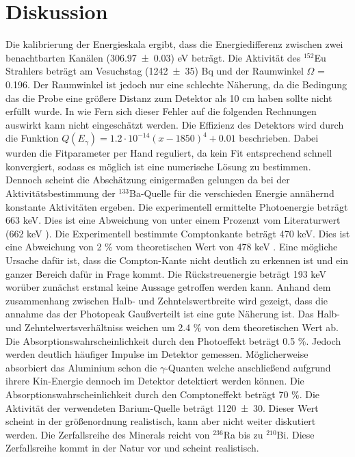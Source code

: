 \section{Diskussion}
\label{sec:Diskussion}
Die kalibrierung der Energieskala ergibt, dass die Energiedifferenz zwischen zwei benachtbarten Kanälen (\num{306.97 +- 0.03}) eV beträgt. Die Aktivität des $^{152}$Eu Strahlers beträgt am Vesuchstag (\num{1242 +- 35}) Bq und der Raumwinkel $\Omega$ = 0.196. Der Raumwinkel ist jedoch nur eine schlechte Näherung, da die Bedingung das die Probe eine größere Distanz zum Detektor als 10 cm haben sollte nicht erfüllt wurde. In wie Fern sich dieser Fehler auf die folgenden Rechnungen auswirkt kann nicht eingeschätzt werden. Die Effizienz des Detektors wird durch die Funktion $Q(E_\gamma) = 1.2 \cdot 10^{-14} (x-1850)^4 +0.01$ beschrieben. Dabei wurden die Fitparameter per Hand reguliert, da kein Fit entsprechend schnell konvergiert, sodass es möglich ist eine numerische Lösung zu bestimmen. Dennoch scheint die Abschätzung einigermaßen gelungen da bei der Aktivitätsbestimmung der $^{133}$Ba-Quelle für die verschieden Energie annähernd konstante Aktivitäten ergeben. Die experimentell ermittelte Photoenergie beträgt 663 keV. Dies ist eine Abweichung von unter einem Prozenzt vom Literaturwert (662 keV \cite{Cs}). Die Experimentell bestimmte Comptonkante beträgt 470 keV. Dies ist eine Abweichung von 2 \% vom theoretischen Wert von 478 keV . Eine mögliche Ursache dafür ist, dass die Compton-Kante nicht deutlich zu erkennen ist und ein ganzer Bereich dafür in Frage kommt. Die Rückstreuenergie beträgt 193 keV worüber zunächst erstmal keine Aussage getroffen werden kann. Anhand dem zusammenhang zwischen Halb- und Zehntelswertbreite wird gezeigt, dass die annahme das der Photopeak Gaußverteilt ist eine gute Näherung ist.  Das Halb- und Zehntelwertsverhältniss weichen um 2.4 \% von dem theoretischen Wert ab.  Die Absorptionswahrscheinlichkeit durch den Photoeffekt beträgt 0.5 \%. Jedoch werden deutlich häufiger Impulse im Detektor gemessen. Möglicherweise absorbiert das Aluminium schon die $\gamma$-Quanten welche anschließend aufgrund ihrere Kin-Energie dennoch im Detektor detektiert werden können. Die Absorptionswahrscheinlichkeit durch den Comptoneffekt beträgt 70 \%. Die Aktivität der verwendeten Barium-Quelle beträgt \num{1120 +- 30}. Dieser Wert scheint in der größenordnung realistisch, kann aber nicht weiter diskutiert werden. Die Zerfallsreihe des Minerals reicht von $^{236}$Ra bis zu $^{210}$Bi. Diese Zerfallsreihe kommt in der Natur vor und scheint realistisch.
